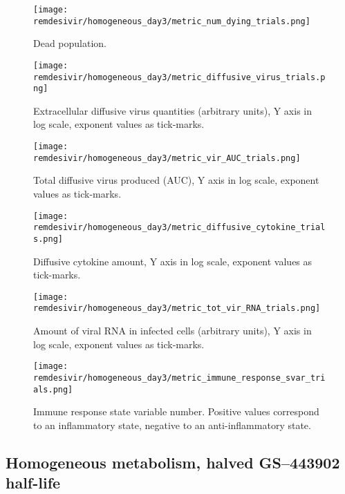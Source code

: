 \begin{figure}[H]
\texttt{[image: remdesivir/homogeneous\_day3/metric\_num\_dying\_trials.png]}
\caption{Dead population.\label{fig:app:homo_regular:day3:dead}}
\end{figure}

\begin{figure}[H]
\texttt{[image: remdesivir/homogeneous\_day3/metric\_diffusive\_virus\_trials.png]}
\caption{Extracellular diffusive virus quantities (arbitrary units), Y axis in log scale, exponent values as tick-marks.\label{fig:app:homo_regular:day3:diff_vir}}
\end{figure}


\begin{figure}[H]
\texttt{[image: remdesivir/homogeneous\_day3/metric\_vir\_AUC\_trials.png]}
\caption{Total diffusive virus produced (AUC), Y axis in log scale, exponent values as tick-marks.\label{fig:app:homo_regular:day3:auc_vir}}
\end{figure}

\begin{figure}[H]
\texttt{[image: remdesivir/homogeneous\_day3/metric\_diffusive\_cytokine\_trials.png]}
\caption{Diffusive cytokine amount, Y axis in log scale, exponent values as tick-marks.\label{fig:app:homo_regular:day3:diff_cyto}}
\end{figure}

\begin{figure}[H]
\texttt{[image: remdesivir/homogeneous\_day3/metric\_tot\_vir\_RNA\_trials.png]}
\caption{Amount of viral RNA in infected cells (arbitrary units), Y axis in log scale, exponent values as tick-marks.\label{fig:app:homo_regular:day3:vir_RNA}}
\end{figure}

\begin{figure}[H]
\texttt{[image: remdesivir/homogeneous\_day3/metric\_immune\_response\_svar\_trials.png]}
\caption{Immune response state variable number. Positive values correspond to an inflammatory state, negative to an anti-inflammatory state.\label{fig:app:homo_regular:day3:immune_var}}
\end{figure}
\clearpage
\subsection{Homogeneous metabolism, halved GS--443902 half-life}\label{sup:sec:extra_figures:homo_halved}
